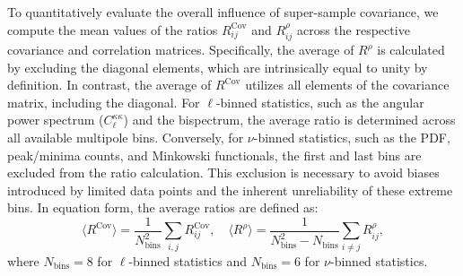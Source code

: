 To quantitatively evaluate the overall influence of super-sample covariance, we compute the mean values of the ratios $R^{\mathrm{Cov}}_{ij}$ and $R^{\rho}_{ij}$ across the respective covariance and correlation matrices. Specifically, the average of $R^{\rho}$ is calculated by excluding the diagonal elements, which are intrinsically equal to unity by definition. In contrast, the average of $R^{\mathrm{Cov}}$ utilizes all elements of the covariance matrix, including the diagonal. For $\ell$-binned statistics, such as the angular power spectrum ($C_\ell^{\kappa\kappa}$) and the bispectrum, the average ratio is determined across all available multipole bins. Conversely, for $\nu$-binned statistics, such as the PDF, peak/minima counts, and Minkowski functionals, the first and last bins are excluded from the ratio calculation. This exclusion is necessary to avoid biases introduced by limited data points and the inherent unreliability of these extreme bins. In equation form, the average ratios are defined as:
\begin{equation}
    \langle R^{\mathrm{Cov}} \rangle = \frac{1}{N_{\mathrm{bins}}^2} \sum_{i, j} R^{\mathrm{Cov}}_{ij}, \quad \langle R^{\rho} \rangle = \frac{1}{N_{\mathrm{bins}}^2 - N_{\mathrm{bins}}} \sum_{i \neq j} R^{\rho}_{ij},
\end{equation}
where $N_{\mathrm{bins}} = 8$ for $\ell$-binned statistics and $N_{\mathrm{bins}} = 6$ for $\nu$-binned statistics.